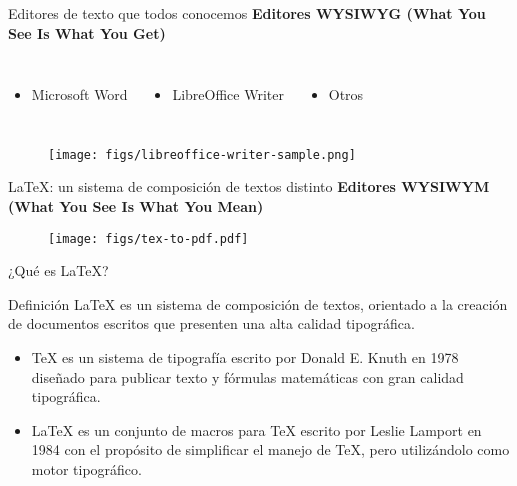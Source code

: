 \documentclass[11pt]{beamer}
\begin{document}
\begin{frame}{Editores de texto que todos conocemos}
\pause
\textbf{Editores WYSIWYG (What You See Is What You Get)}
\begin{columns}
\begin{itemize}
  \item \small{Microsoft Word}
\end{itemize}  
\begin{itemize}
  \item \small{LibreOffice Writer}
\end{itemize}
\begin{itemize}
  \item \small{Otros}
\end{itemize}
\end{columns}

\begin{figure}[b]
  \centering
  \texttt{[image: figs/libreoffice-writer-sample.png]}
\end{figure}
\end{frame}

\begin{frame}{{\LaTeX}: un sistema de composición de textos distinto}
\textbf{Editores WYSIWYM (What You See Is What You Mean)}
\begin{figure}
\centering
\texttt{[image: figs/tex-to-pdf.pdf]}
\end{figure}
\end{frame}

\begin{frame}{¿Qué es {\LaTeX}?}

\begin{block}{Definición}
{\LaTeX} es un sistema de composición de textos, orientado a la creación de documentos escritos que presenten una alta calidad tipográfica.
\end{block}

\begin{itemize}
\item \TeX{} es un sistema de tipografía escrito por Donald E. Knuth en 1978 diseñado para publicar texto y fórmulas matemáticas con gran calidad tipográfica.
\item {\LaTeX} es un conjunto de macros para {\TeX} escrito por Leslie Lamport en 1984 con el propósito de simplificar el manejo de {\TeX}, pero utilizándolo como motor tipográfico.
\end{itemize}
\end{frame}
\end{document}
